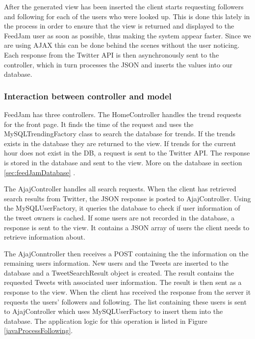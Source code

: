 After the generated view has been inserted the client starts requesting followers and following for each of the users who were looked up. This is done this lately in the process in order to ensure that the view is returned and displayed to the FeedJam user as soon as possible, thus making the system appear faster. Since we are using AJAX this can be done behind the scenes without the user noticing. Each response from the Twitter API is then asynchronously sent to the controller, which in turn processes the JSON and inserts the values into our database.

\subsubsection{Interaction between controller and model} %
\label{modelControllerInteraction}
FeedJam has three controllers. The HomeController handles the trend requests for the front page. It finds the time of the request and uses the MySQLTrendingFactory class to search the database for trends. If the trends exists in the database they are returned to the view. If trends for the current hour does not exist in the DB, a request is sent to the  Twitter API. The response is stored in the database and sent to the view. More on the database in section \ref{sec:feedJamDatabase} .

The AjajController handles all search requests. When the client has retrieved search results from Twitter, the JSON response is posted to AjajController. Using the MySQLUserFactory, it queries the database to check if user information of the tweet owners is cached. If some users are not recorded in the database, a response is sent to the view. It contains a JSON array of users the client needs to retrieve information about. 

The AjajConntroller then receives a POST containing the the information on the remaining users information. New users and the Tweets are inserted to the database and a TweetSearchResult object is created. The result contains the requested Tweets with associated user information. The result is then sent as a response to the view. When the client has received the response from the server it requests the users' followers and following. The list containing these users is sent to AjajController which uses MySQLUserFactory to insert them into the database. The application logic for this operation is listed in Figure \ref{javaProcessFollowing}.

